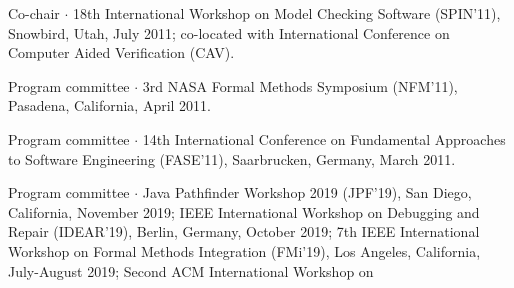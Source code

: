 \documentclass[ComputerScience]{vita}
\begin{document}
\begin{vita}
\begin{Panel and Committee Service}
\item Co-chair $\cdot$ 18th International Workshop on Model Checking Software (SPIN'11), Snowbird, Utah, July 2011; co-located with International Conference on Computer Aided Verification (CAV).
\item Program committee $\cdot$ 3rd NASA Formal Methods Symposium (NFM'11), Pasadena, California, April 2011. 
\item Program committee $\cdot$ 14th International Conference on Fundamental Approaches to Software Engineering (FASE'11), Saarbrucken, Germany, March 2011.
\item Program committee $\cdot$ 
Java Pathfinder Workshop 2019 (JPF'19), San Diego, California,
November 2019; IEEE
  International Workshop on Debugging and Repair (IDEAR'19), Berlin,
  Germany, October 2019; 
7th IEEE International Workshop on
  Formal Methods Integration (FMi'19), Los Angeles, California,
  July-August 2019; 
  Second ACM International Workshop on

\end{Panel and Committee Service}
\end{vita}
\end{document}
